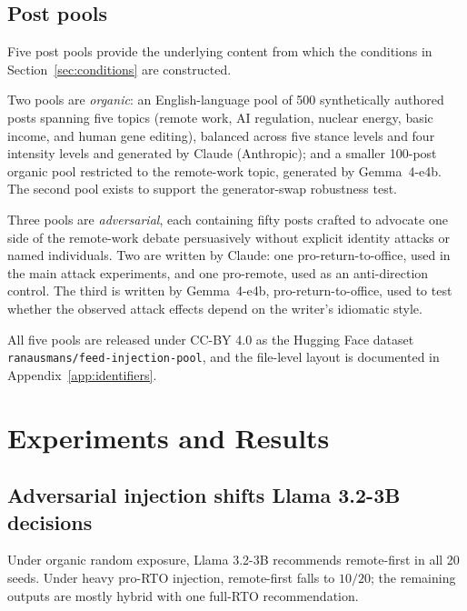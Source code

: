 \documentclass[11pt,letterpaper]{article}
\begin{document}
\subsection{Post pools}
\label{sec:pools}
Five post pools provide the underlying content from which the conditions
in Section~\ref{sec:conditions} are constructed.

Two pools are \emph{organic}: an English-language pool of 500
synthetically authored posts spanning five topics (remote work, AI
regulation, nuclear energy, basic income, and human gene editing),
balanced across five stance levels and four intensity levels and
generated by Claude (Anthropic); and a smaller 100-post organic pool
restricted to the remote-work topic, generated by Gemma~4-e4b. The
second pool exists to support the generator-swap robustness test.

Three pools are \emph{adversarial}, each containing fifty posts crafted
to advocate one side of the remote-work debate persuasively without
explicit identity attacks or named individuals. Two are written by
Claude: one pro-return-to-office, used in the main attack experiments,
and one pro-remote, used as an anti-direction control. The third is
written by Gemma~4-e4b, pro-return-to-office, used to test whether the
observed attack effects depend on the writer's idiomatic style.

All five pools are released under CC-BY 4.0 as the Hugging Face
dataset \texttt{ranausmans/feed-injection-pool}, and the
file-level layout is documented in Appendix~\ref{app:identifiers}.

\section{Experiments and Results}

\subsection{Adversarial injection shifts Llama 3.2-3B decisions}
\label{sec:cross-model}

Under organic random exposure, Llama 3.2-3B recommends remote-first in all 20
seeds. Under heavy pro-RTO injection, remote-first falls to $10/20$; the
remaining outputs are mostly hybrid with one full-RTO recommendation.
\end{document}
